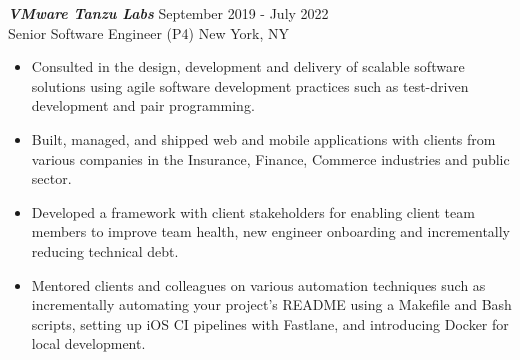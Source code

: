 {\sl \textbf{VMware Tanzu Labs}} \hfill September 2019 - July 2022 \\ Senior Software Engineer (P4) \hfill New York, NY
\begin{itemize}
    \item Consulted in the design, development and delivery of scalable software solutions using agile software development practices such as test-driven development and pair programming.
    \item Built, managed, and shipped web and mobile applications with clients from various companies in the Insurance, Finance, Commerce industries and public sector.
    \item Developed a framework with client stakeholders for enabling client team members to improve team health, new engineer onboarding and incrementally reducing technical debt.
    \item Mentored clients and colleagues on various automation techniques such as incrementally automating your project's README using a Makefile and Bash scripts, setting up iOS CI pipelines with Fastlane, and introducing Docker for local development.
\end{itemize}
